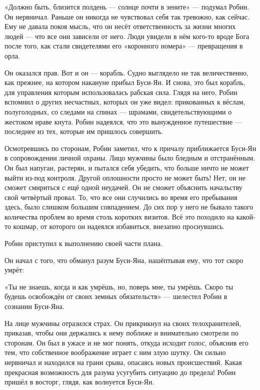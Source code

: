 \documentclass[a5paper, 9pt,
final, openany, twoside=true]{memoir}
\begin{document}
«Должно быть, близится полдень — солнце почти в зените» — подумал Робин. Он нервничал. Раньше он никогда не чувствовал себя так тревожно, как сейчас. Ему не давала покоя мысль, что он несёт ответственность за жизни многих людей — что все они зависели от него. Люди увидели в нём кого-то вроде Бога после того, как стали свидетелями его «коронного номера» — превращения в орла.\bigskip

Он оказался прав. Вот и он — корабль. Судно выглядело не так величественно, как прежнее, на котором накануне прибыл Буси-Ян. И снова, это был корабль, для управления которым использовалась рабская сила. Глядя на него, Робин вспомнил о других несчастных, которых он уже видел: прикованных к вёслам, полуголодных, со следами на спинах — шрамами, свидетельствующими о жестоком нраве кнута. Робин надеялся, что это вынужденное путешествие — последнее из тех, которые им пришлось совершить.

Осмотревшись по сторонам, Робин заметил, что к причалу приближается Буси-Ян в сопровождении личной охраны. Лицо мужчины было бледным и отстранённым. Он был напуган, растерян, и пытался себя убедить, что больше ничто не может выйти из-под контроля. Другой оплошности просто не может быть! Нет, он не сможет смириться с ещё одной неудачей. Он не сможет объяснить начальству свой четвёртый провал. То, что все они случились во время его пребывания здесь, было слишком большим совпадением. До сих пор у него не бывало такого количества проблем во время столь коротких визитов. Всё это походило на какой-то кошмар, от которого он надеялся избавиться, внезапно проснувшись.\bigskip

Робин приступил к выполнению своей части плана.

Он начал с того, что обманул разум Буси-Яна, нашёптывая ему, что тот скоро умрёт:

«Ты не знаешь, когда и как умрёшь, но, поверь мне, ты умрёшь. Скоро ты будешь освобождён от своих земных обязательств» — шелестел Робин в сознании Буси-Яна.

На лице мужчины отразился страх. Он прикрикнул на своих телохранителей, приказав, чтобы они держались к нему поближе и внимательно смотрели по сторонам. Он был в ужасе и не мог понять, откуда исходит голос, объяснив его тем, что собственное воображение играет с ним злую шутку. Он сильно нервничал и находился на грани срыва, опасаясь новых происшествий. Какая прекрасная возможность для разума усугубить ситуацию до предела! Робин пришёл в восторг, глядя, как волнуется Буси-Ян.
\end{document}
